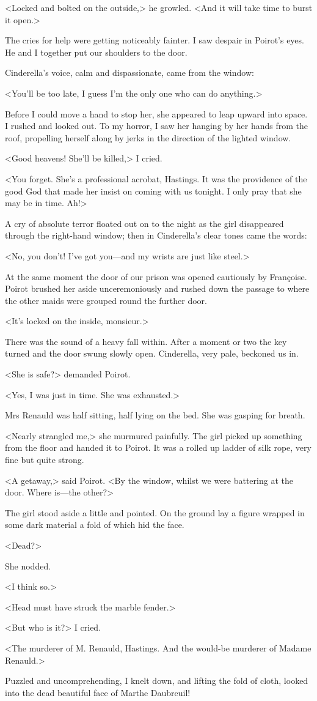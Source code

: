  <Locked and bolted on the outside,> he growled. <And it will take time to burst it open.> 

 The cries for help were getting noticeably fainter. I saw despair in Poirot's eyes. He and I together put our shoulders to the door. 

 Cinderella's voice, calm and dispassionate, came from the window: 

 <You'll be too late, I guess I'm the only one who can do anything.> 

 Before I could move a hand to stop her, she appeared to leap upward into space. I rushed and looked out. To my horror, I saw her hanging by her hands from the roof, propelling herself along by jerks in the direction of the lighted window. 

 <Good heavens! She'll be killed,> I cried. 

 <You forget. She's a professional acrobat, Hastings. It was the providence of the good God that made her insist on coming with us tonight. I only pray that she may be in time. Ah!> 

 A cry of absolute terror floated out on to the night as the girl disappeared through the right-hand window; then in Cinderella's clear tones came the words: 

 <No, you don't! I've got you—and my wrists are just like steel.> 

 At the same moment the door of our prison was opened cautiously by Françoise. Poirot brushed her aside unceremoniously and rushed down the passage to where the other maids were grouped round the further door. 

 <It's locked on the inside, monsieur.> 

 There was the sound of a heavy fall within. After a moment or two the key turned and the door swung slowly open. Cinderella, very pale, beckoned us in. 

 <She is safe?> demanded Poirot. 

 <Yes, I was just in time. She was exhausted.> 

 Mrs Renauld was half sitting, half lying on the bed. She was gasping for breath. 

 <Nearly strangled me,> she murmured painfully. The girl picked up something from the floor and handed it to Poirot. It was a rolled up ladder of silk rope, very fine but quite strong. 

 <A getaway,> said Poirot. <By the window, whilst we were battering at the door. Where is—the other?> 

 The girl stood aside a little and pointed. On the ground lay a figure wrapped in some dark material a fold of which hid the face. 

 <Dead?> 

 She nodded. 

 <I think so.> 

 <Head must have struck the marble fender.> 

 <But who is it?> I cried. 

 <The murderer of M. Renauld, Hastings. And the would-be murderer of Madame Renauld.> 

 Puzzled and uncomprehending, I knelt down, and lifting the fold of cloth, looked into the dead beautiful face of Marthe Daubreuil!